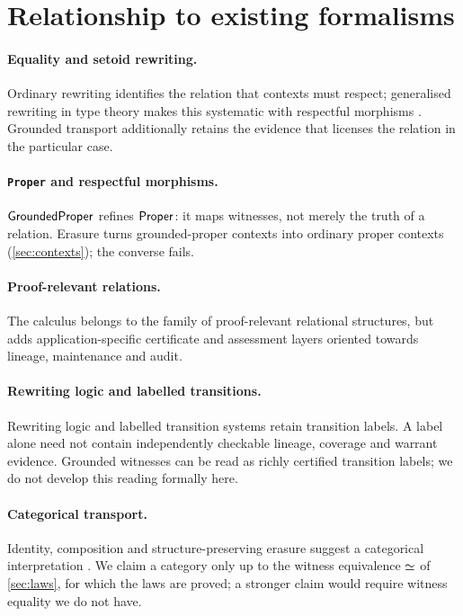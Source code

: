 \section{Relationship to existing formalisms}\label{sec:related}

\paragraph{Equality and setoid rewriting.}
Ordinary rewriting identifies the relation that contexts must respect; generalised rewriting in type theory makes this systematic with respectful morphisms \cite{sozeau2009}. Grounded transport additionally retains the evidence that licenses the relation in the particular case.

\paragraph{\texttt{Proper} and respectful morphisms.}
$\mathsf{GroundedProper}$ refines $\mathsf{Proper}$: it maps witnesses, not merely the truth of a relation. Erasure turns grounded-proper contexts into ordinary proper contexts (\cref{sec:contexts}); the converse fails.

\paragraph{Proof-relevant relations.}
The calculus belongs to the family of proof-relevant relational structures, but adds application-specific certificate and assessment layers oriented towards lineage, maintenance and audit.

\paragraph{Rewriting logic and labelled transitions.}
Rewriting logic \cite{meseguer1992} and labelled transition systems retain transition labels. A label alone need not contain independently checkable lineage, coverage and warrant evidence. Grounded witnesses can be read as richly certified transition labels; we do not develop this reading formally here.

\paragraph{Categorical transport.}
Identity, composition and structure-preserving erasure suggest a categorical interpretation \cite{maclane1998}. We claim a category only up to the witness equivalence $\mathrel{\simeq}$ of \cref{sec:laws}, for which the laws are proved; a stronger claim would require witness equality we do not have.

